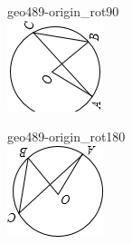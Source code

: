 \documentclass[12pt]{article}
\begin{document}
\begin{center}
\begin{minipage}{0.32\textwidth}
\end{minipage}
\hfill\begin{minipage}{0.32\textwidth}\centering
geo489-origin\_rot90\\
\includegraphics[width=0.95\linewidth]{out_rommath_origin/items/geo489-origin/assets/figure_rot90.png}
\end{minipage}
\par\medskip
\begin{minipage}{0.32\textwidth}\centering
geo489-origin\_rot180\\
\includegraphics[width=0.95\linewidth]{out_rommath_origin/items/geo489-origin/assets/figure_rot180.png}

\end{minipage}
\end{center}
\end{document}
